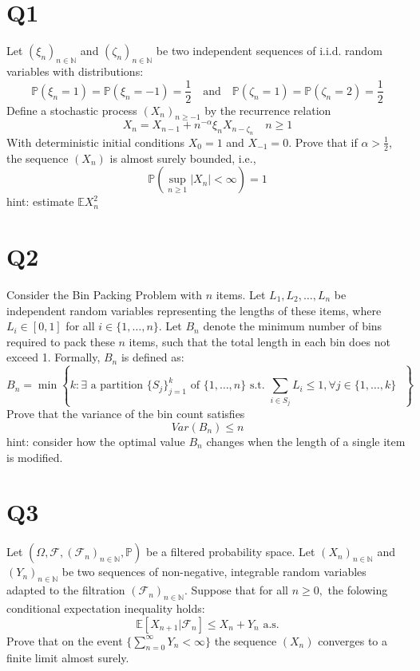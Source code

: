 \documentclass[11pt]{article}
\begin{document}
\section{Q1}
Let $(\xi_n)_{n \in \mathbb{N}}$ and $(\zeta_n)_{n \in \mathbb{N}}$ be two independent sequences
of i.i.d. random variables with distributions:
\[
    \mathbb{P}(\xi_n = 1) = \mathbb{P}(\xi_n = -1) = \frac{1}{2} \quad \text{and} \quad \mathbb{P}(\zeta_n = 1) = \mathbb{P}(\zeta_n = 2) = \frac{1}{2}
\] 
Define a stochastic process $(X_n)_{n \ge -1}$ by the recurrence relation
 \[
     X_n = X_{n-1} + n^{-\alpha} \xi_n X_{n- \zeta_n} \quad n \ge 1
\] 
With deterministic initial conditions $X_0 = 1$ and $X_{-1} = 0$.
Prove that if  $\alpha > \frac{1}{2}$, the sequence $(X_n)$ is almost surely bounded, i.e.,
 \[
     \mathbb{P}(\sup_{n \ge 1} |X_n| < \infty) = 1
\] 
hint: estimate $ \mathbb{E} X_n^2$

\section{Q2}
Consider the Bin Packing Problem with $n$ items. Let $L_1,L_2,\dots,L_n$ be independent random variables representing the lengths of these items, where $L_i \in [0,1]$ for all  $i \in \{1,\dots,n\}$.
Let $B_n$ denote the minimum number of bins required to pack these  $n$ items, such that the total length in each
bin does not exceed 1. Formally, $B_n$ is defined as:
 \[
     B_n = \min\left\{k : \exists \text{ a partition $\{S_j\}_{j=1}^{k}$ of $\{1,\dots,n\}$ s.t.  $\sum_{i \in S_j}^{}L_i \le 1, \forall j \in \{1,\dots,k\}$ } \right\}
\] 
Prove that the variance of the bin count satisfies
\[
Var(B_n) \le n
\] 
hint: consider how the optimal value $B_n$ changes when the length of a single item is modified.

\section{Q3}
Let  $(\Omega, \mathcal{F}, ( \mathcal{F}_n)_{n \in \mathbb{N}}, \mathbb{P})$ be a filtered probability space.
Let $(X_n)_{n \in \mathbb{N}}$ and $(Y_n)_{n \in \mathbb{N}}$ be two sequences
of non-negative, integrable random variables adapted to the filtration $( \mathcal{F}_n)_{n \in \mathbb{N}}$.
Suppose that for all $n \ge 0,$ the folowing conditional expectation inequality holds:
 \[
     \mathbb{E}[X_{n+1} | \mathcal{F}_n] \le X_n + Y_n \text{ a.s.}
\] 
Prove that on the event $\{ \sum_{n=0}^{\infty}Y_n < \infty\}$ the sequence $(X_n)$ converges to a finite limit almost surely.
\end{document}
